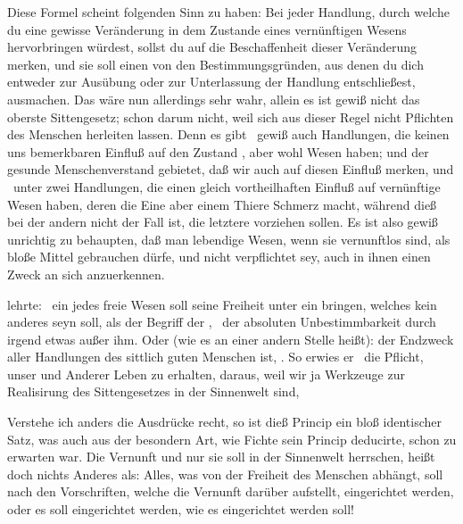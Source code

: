 Diese Formel scheint folgenden Sinn zu haben: Bei jeder Handlung, durch welche du eine gewisse Veränderung in dem Zustande eines vernünftigen Wesens hervorbringen würdest, sollst du auf die Beschaffenheit dieser Veränderung merken, und sie soll einen von den Bestimmungsgründen, aus denen du dich entweder zur Ausübung oder zur Unterlassung der Handlung entschließest, ausmachen. Das wäre nun allerdings sehr wahr, allein es ist gewiß nicht das oberste Sittengesetz; schon darum nicht, weil sich aus dieser Regel nicht  Pflichten des Menschen herleiten lassen. Denn es gibt \zB\ gewiß auch Handlungen, die keinen uns bemerkbaren Einfluß auf den Zustand , aber wohl  Wesen haben; und der gesunde Menschenverstand gebietet, daß wir auch auf diesen Einfluß merken, und \zB\ unter zwei Handlungen, die einen gleich vortheilhaften Einfluß auf vernünftige Wesen haben, deren die Eine aber einem Thiere Schmerz macht, während dieß bei der andern nicht der Fall ist, die letztere vorziehen sollen. Es ist also gewiß unrichtig zu behaupten, daß man lebendige Wesen, wenn sie vernunftlos sind, als bloße Mittel gebrauchen dürfe, und nicht verpflichtet sey, auch in ihnen einen Zweck an sich anzuerkennen.
\begin{aufza}\setcounter{enumi}{17}
\item {} lehrte:  \dh\ ein jedes freie Wesen soll seine Freiheit unter ein  bringen, welches kein anderes seyn soll, als der Begriff der , \dh\ der absoluten Unbestimmbarkeit durch irgend etwas außer ihm. Oder (wie es an einer andern Stelle heißt): der Endzweck aller Handlungen des sittlich guten Menschen ist, . So erwies er \zB\ die Pflicht, unser und Anderer Leben zu erhalten, daraus, weil wir ja Werkzeuge zur Realisirung des Sittengesetzes in der Sinnenwelt sind, \udgl
\end{aufza}\par 
Verstehe ich anders die Ausdrücke recht, so ist dieß Princip ein bloß identischer Satz, was auch aus der besondern Art, wie Fichte sein Princip deducirte, schon zu erwarten war. Die Vernunft und nur sie soll in der Sinnenwelt herrschen, heißt doch nichts Anderes als: Alles, was von der Freiheit des Menschen abhängt, soll nach den Vorschriften, welche die Vernunft darüber aufstellt, eingerichtet werden, oder es soll eingerichtet werden, wie es eingerichtet werden soll!

